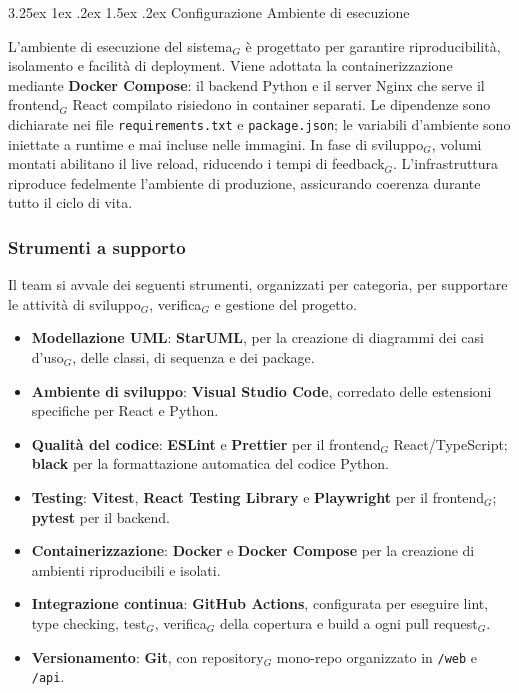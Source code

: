 \documentclass[a4paper, 10pt]{article}
\makeatletter
\renewcommand\paragraph{\@startsection{paragraph}{4}{\z@}%
  {3.25ex \@plus1ex \@minus .2ex}%
  {1.5ex \@plus .2ex}%
  {\normalfont\normalsize\bfseries}}
\makeatother
\begin{document}
\paragraph{Configurazione Ambiente di esecuzione}

L'ambiente di esecuzione del sistema$_G$ è progettato per garantire riproducibilità, isolamento e facilità di deployment. Viene adottata la containerizzazione mediante \textbf{Docker Compose}: il backend Python e il server Nginx che serve il frontend$_G$ React compilato risiedono in container separati. Le dipendenze sono dichiarate nei file \texttt{requirements.txt} e \texttt{package.json}; le variabili d'ambiente sono iniettate a runtime e mai incluse nelle immagini. In fase di sviluppo$_G$, volumi montati abilitano il live reload, riducendo i tempi di feedback$_G$. L'infrastruttura riproduce fedelmente l'ambiente di produzione, assicurando coerenza durante tutto il ciclo di vita.

\subsubsection{Strumenti a supporto}

Il team si avvale dei seguenti strumenti, organizzati per categoria, per supportare le attività di sviluppo$_G$, verifica$_G$ e gestione del progetto.

\begin{itemize}
    \item \textbf{Modellazione UML}: \textbf{StarUML}, per la creazione di diagrammi dei casi d'uso$_G$, delle classi, di sequenza e dei package.
    \item \textbf{Ambiente di sviluppo}: \textbf{Visual Studio Code}, corredato delle estensioni specifiche per React e Python.
    \item \textbf{Qualità del codice}: \textbf{ESLint} e \textbf{Prettier} per il frontend$_G$ React/TypeScript; \textbf{black} per la formattazione automatica del codice Python.
    \item \textbf{Testing}: \textbf{Vitest}, \textbf{React Testing Library} e \textbf{Playwright} per il frontend$_G$; \textbf{pytest} per il backend.
    \item \textbf{Containerizzazione}: \textbf{Docker} e \textbf{Docker Compose} per la creazione di ambienti riproducibili e isolati.
    \item \textbf{Integrazione continua}: \textbf{GitHub Actions}, configurata per eseguire lint, type checking, test$_G$, verifica$_G$ della copertura e build a ogni pull request$_G$.
    \item \textbf{Versionamento}: \textbf{Git}, con repository$_G$ mono-repo organizzato in \texttt{/web} e \texttt{/api}.
\end{itemize}
\end{document}
